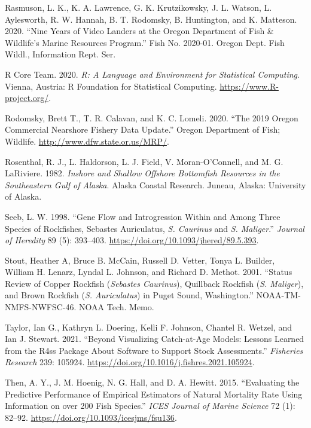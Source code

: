 \documentclass[11pt,
  english,
  a4paper,
]{article}
\begin{document}
\leavevmode\hypertarget{ref-rasmuson_lander_2020}{}%
Rasmuson, L. K., K. A. Lawrence, G. K. Krutzikowsky, J. L. Watson, L. Aylesworth, R. W. Hannah, B. T. Rodomsky, B. Huntington, and K. Matteson. 2020. ``Nine Years of Video Landers at the Oregon Department of Fish \& Wildlife's Marine Resources Program.'' Fish No. 2020-01. Oregon Dept. Fish Wildl., Information Rept. Ser.

\leavevmode\hypertarget{ref-R_2020}{}%
R Core Team. 2020. \emph{R: A Language and Environment for Statistical Computing}. Vienna, Austria: R Foundation for Statistical Computing. \url{https://www.R-project.org/}.

\leavevmode\hypertarget{ref-rodomsky_2019_2020}{}%
Rodomsky, Brett T., T. R. Calavan, and K. C. Lomeli. 2020. ``The 2019 Oregon Commercial Nearshore Fishery Data Update.'' Oregon Department of Fish; Wildlife. \url{http://www.dfw.state.or.us/MRP/}.

\leavevmode\hypertarget{ref-Rosenthaletal_maturity_1982}{}%
Rosenthal, R. J., L. Haldorson, L. J. Field, V. Moran-O'Connell, and M. G. LaRiviere. 1982. \emph{Inshore and Shallow Offshore Bottomfish Resources in the Southeastern Gulf of Alaska}. Alaska Coastal Research. Juneau, Alaska: University of Alaska.

\leavevmode\hypertarget{ref-seeb_gene_1998}{}%
Seeb, L. W. 1998. ``Gene Flow and Introgression Within and Among Three Species of Rockfishes, Sebastes Auriculatus, \emph{S. Caurinus} and \emph{S. Maliger}.'' \emph{Journal of Heredity} 89 (5): 393--403. \url{https://doi.org/10.1093/jhered/89.5.393}.

\leavevmode\hypertarget{ref-Stoutetal_DPS_2001}{}%
Stout, Heather A, Bruce B. McCain, Russell D. Vetter, Tonya L. Builder, William H. Lenarz, Lyndal L. Johnson, and Richard D. Methot. 2001. ``Status Review of Copper Rockfish (\emph{Sebastes Caurinus}), Quillback Rockfish (\emph{S. Maliger}), and Brown Rockfish (\emph{S. Auriculatus}) in Puget Sound, Washington.'' NOAA-TM-NMFS-NWFSC-46. NOAA Tech. Memo.

\leavevmode\hypertarget{ref-r4ss_2021}{}%
Taylor, Ian G., Kathryn L. Doering, Kelli F. Johnson, Chantel R. Wetzel, and Ian J. Stewart. 2021. ``Beyond Visualizing Catch-at-Age Models: Lessons Learned from the R4ss Package About Software to Support Stock Assessments.'' \emph{Fisheries Research} 239: 105924. \url{https://doi.org/10.1016/j.fishres.2021.105924}.

\leavevmode\hypertarget{ref-then_evaluating_2015-1}{}%
Then, A. Y., J. M. Hoenig, N. G. Hall, and D. A. Hewitt. 2015. ``Evaluating the Predictive Performance of Empirical Estimators of Natural Mortality Rate Using Information on over 200 Fish Species.'' \emph{ICES Journal of Marine Science} 72 (1): 82--92. \url{https://doi.org/10.1093/icesjms/fsu136}.
\end{document}
